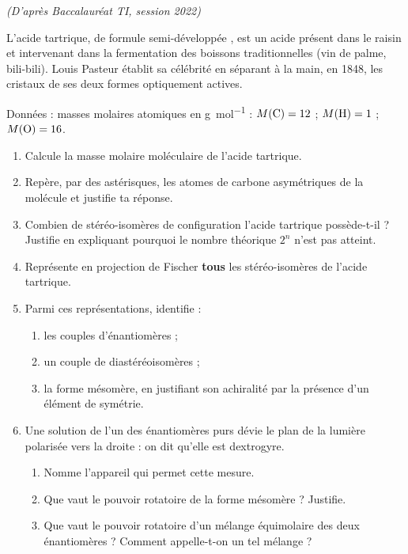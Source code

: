 \documentclass[11pt]{article}
\begin{document}
\begin{exercice}
\emph{(D'après Baccalauréat TI, session 2022)}

L'acide tartrique, de formule semi-développée , est un acide présent dans le raisin et intervenant dans la fermentation des boissons traditionnelles (vin de palme, bili-bili). Louis Pasteur établit sa célébrité en séparant à la main, en 1848, les cristaux de ses deux formes optiquement actives.

Données : masses molaires atomiques en \si{g.mol^{-1}} : $M(\ce{C}) = 12$ ; $M(\ce{H}) = 1$ ; $M(\ce{O}) = 16$.
\begin{enumerate}
\item Calcule la masse molaire moléculaire de l'acide tartrique.
\item Repère, par des astérisques, les atomes de carbone asymétriques de la molécule et justifie ta réponse.
\item Combien de stéréo-isomères de configuration l'acide tartrique possède-t-il ? Justifie en expliquant pourquoi le nombre théorique $2^n$ n'est pas atteint.
\item Représente en projection de Fischer \textbf{tous} les stéréo-isomères de l'acide tartrique.
\item Parmi ces représentations, identifie :
\begin{enumerate}
\item les couples d'énantiomères ;
\item un couple de diastéréoisomères ;
\item la forme mésomère, en justifiant son achiralité par la présence d'un élément de symétrie.
\end{enumerate}
\item Une solution de l'un des énantiomères purs dévie le plan de la lumière polarisée vers la droite : on dit qu'elle est dextrogyre.
\begin{enumerate}
\item Nomme l'appareil qui permet cette mesure.
\item Que vaut le pouvoir rotatoire de la forme mésomère ? Justifie.
\item Que vaut le pouvoir rotatoire d'un mélange équimolaire des deux énantiomères ? Comment appelle-t-on un tel mélange ?
\end{enumerate}
\end{enumerate}
\end{exercice}
\end{document}

